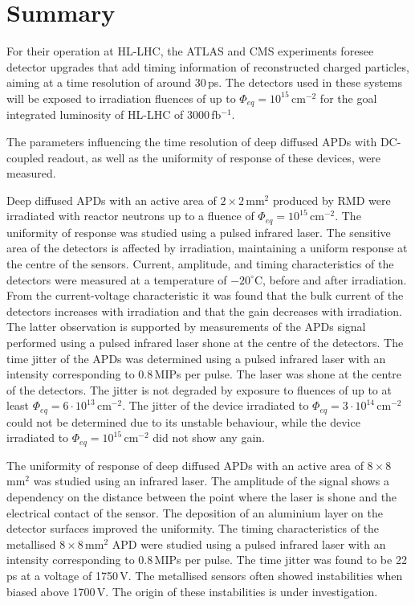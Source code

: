 \documentclass{article}
\begin{document}
\section{Summary}
\label{sec:summary}

For their operation at HL-LHC, the ATLAS and CMS experiments foresee detector upgrades that add timing information of reconstructed charged particles, aiming at a time resolution of around 30\,ps.
The detectors used in these systems will be exposed to irradiation fluences of up to $\Phi_{eq} = 10^{15}$\,cm$^{-2}$ for the goal integrated luminosity of HL-LHC of 3000\,fb$^{-1}$.

The parameters influencing the time resolution of deep diffused APDs with DC-coupled readout, as well as the uniformity of response of these devices, were measured.

Deep diffused APDs with an active area of $2 \times 2$\,mm$^2$ produced by RMD were irradiated with reactor neutrons up to a fluence of $\Phi_{eq} = 10^{15}$\,cm$^{-2}$.
The uniformity of response was studied using a pulsed infrared laser.
The sensitive area of the detectors is affected by irradiation, maintaining a uniform response at the centre of the sensors.
Current, amplitude, and timing characteristics of the detectors were measured at a temperature of $-20^\circ$C, before and after irradiation.
From the current-voltage characteristic it was found that the bulk current of the detectors increases with irradiation and that the gain decreases with irradiation.
The latter observation is supported by measurements of the APDs signal performed using a pulsed infrared laser shone at the centre of the detectors.
The time jitter of the APDs was determined using a pulsed infrared laser with an intensity corresponding to 0.8\,MIPs per pulse.
The laser was shone at the centre of the detectors.
The jitter is not degraded by exposure to fluences of up to at least $\Phi_{eq} = 6 \cdot 10^{13}$\,cm$^{-2}$.
The jitter of the device irradiated to $\Phi_{eq} = 3 \cdot 10^{14}$\,cm$^{-2}$ could not be determined due to its unstable behaviour, while the device irradiated to $\Phi_{eq} = 10^{15}$\,cm$^{-2}$ did not show any gain.


The uniformity of response of deep diffused APDs with an active area of $8 \times 8$\,mm$^2$ was studied using an infrared laser.
The amplitude of the signal shows a dependency on the distance between the point where the laser is shone and the electrical contact of the sensor.
The deposition of an aluminium layer on the detector surfaces improved the uniformity.
The timing characteristics of the metallised $8 \times 8$\,mm$^2$ APD were studied using a pulsed infrared laser with an intensity corresponding to 0.8\,MIPs per pulse.
The time jitter was found to be 22\,ps at a voltage of 1750\,V.
The metallised sensors often showed instabilities when biased above 1700\,V.
The origin of these instabilities is under investigation.
\end{document}

